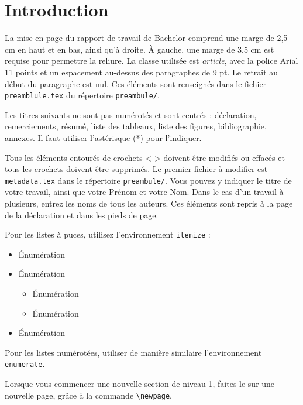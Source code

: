 

\section{Introduction}

La mise en page du rapport de travail de Bachelor comprend une marge de 2,5 cm en haut et en bas, ainsi qu’à droite. À gauche, une marge de 3,5 cm est requise pour permettre la reliure. La classe utilisée est \emph{article}, avec la police Arial 11 points et un espacement au-dessus des paragraphes de 9 pt. Le retrait au début du paragraphe est nul. Ces éléments sont renseignés dans le fichier \texttt{preamblule.tex} du répertoire \texttt{preambule/}.

Les titres suivants ne sont pas numérotés et sont centrés : déclaration, remerciements, résumé, liste des tableaux, liste des figures, bibliographie, annexes. Il faut utiliser l'astérisque (*) pour l'indiquer.

Tous les éléments entourés de crochets < > doivent être modifiés ou effacés et tous les crochets doivent être supprimés. Le premier fichier à modifier est \texttt{metadata.tex} dans le répertoire \texttt{preambule/}. Vous pouvez y indiquer le titre de votre travail, ainsi que votre Prénom et votre Nom. Dans le cas d'un travail à plusieurs, entrez les noms de tous les auteurs. Ces éléments sont repris à la page de la déclaration et dans les pieds de page.


Pour les listes à puces, utilisez l'environnement \texttt{itemize} :

\begin{itemize}[itemsep=0pt]
	\item Énumération
	\item Énumération
	\begin{itemize}[itemsep=0pt]
		\item Énumération
		\item Énumération
	\end{itemize}
	\item Énumération
\end{itemize}

Pour les listes numérotées, utiliser de manière similaire l'environnement \texttt{enumerate}.

Lorsque vous commencer une nouvelle section de niveau 1, faites-le sur une nouvelle page, grâce à la commande \verb?\newpage?.

